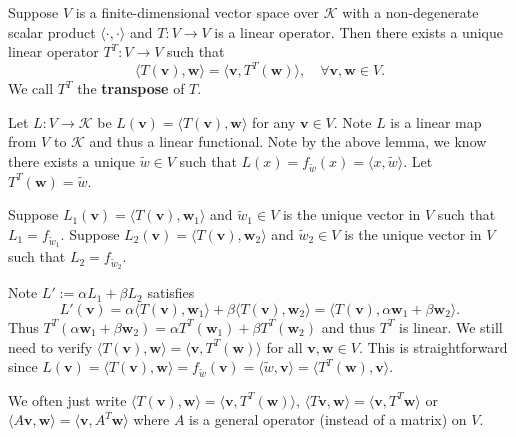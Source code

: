     \begin{theoremenv}\label{transpose existence}
        Suppose $V$ is a finite-dimensional vector space over $\mathcal{K}$ with a non-degenerate scalar product $\langle \cdot, \cdot \rangle$ and $T: V \to V$ is a linear operator. Then there exists a unique linear operator $T^T: V \to V$ such that
        \[
        \langle T(\bm{v}), \bm{w} \rangle = \langle \bm{v}, T^T (\bm{w}) \rangle, \quad \forall \bm{v}, \bm{w} \in V.
        \]
        We call $T^T$ the \textbf{transpose} of $T$.
    \end{theoremenv}
    \begin{proofenv}
        Let $L: V \to \mathcal{K}$ be $L(\bm{v}) = \langle T(\bm{v}), \bm{w} \rangle$ for any $\bm{v} \in V$. Note $L$ is a linear map from $V$ to $\mathcal{K}$ and thus a linear functional. Note by the above lemma, we know there exists a unique $\tilde{w} \in V$ such that $L(x)=f_{\tilde{w}}(x) = \langle x, \tilde{w} \rangle$. Let $T^T(\bm{w}) = \tilde{w}$.

        Suppose $L_1(\bm{v}) = \langle T(\bm{v}), \bm{w}_1 \rangle$ and $\tilde{w}_1 \in V$ is the unique vector in $V$ such that $L_1 = f_{\tilde{w}_1}$. Suppose $L_2(\bm{v}) = \langle T(\bm{v}), \bm{w}_2 \rangle$ and $\tilde{w}_2 \in V$ is the unique vector in $V$ such that $L_2 = f_{\tilde{w}_2}$.

        Note $L' := \alpha L_1 + \beta L_2$ satisfies
        \[
        L'(\bm{v}) = \alpha \langle T(\bm{v}), \bm{w}_1 \rangle + \beta \langle T(\bm{v}), \bm{w}_2 \rangle = \langle T(\bm{v}), \alpha \bm{w}_1 + \beta \bm{w}_2 \rangle.
        \]
        Thus $T^T(\alpha \bm{w}_1 + \beta \bm{w}_2) = \alpha T^T(\bm{w}_1) + \beta T^T(\bm{w}_2)$ and thus $T^T$ is linear. We still need to verify $\langle T(\bm{v}), \bm{w} \rangle = \langle \bm{v}, T^T (\bm{w}) \rangle$ for all $\bm{v}, \bm{w} \in V$. This is straightforward since $L(\bm{v}) = \langle T(\bm{v}), \bm{w} \rangle = f_{\tilde{w}}(\bm{v}) = \langle \tilde{w}, \bm{v} \rangle = \langle T^T(\bm{w}), \bm{v} \rangle$.
    \end{proofenv}
    \begin{remarkenv}
        We often just write $\langle T(\bm{v}), \bm{w} \rangle = \langle \bm{v}, T^T (\bm{w}) \rangle$, $\langle T\bm{v}, \bm{w} \rangle = \langle \bm{v}, T^T \bm{w} \rangle$ or $\langle A\bm{v}, \bm{w} \rangle = \langle \bm{v}, A^T \bm{w} \rangle$ where $A$ is a general operator (instead of a matrix) on $V$.
    \end{remarkenv}
